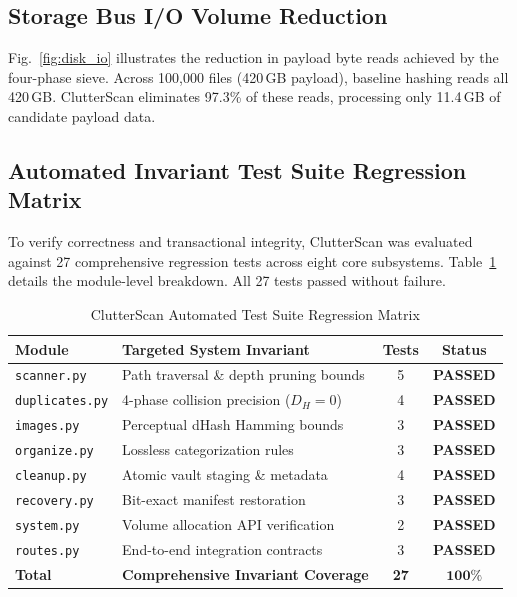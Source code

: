 \documentclass[journal,compsoc,10pt,twocolumn]{IEEEtran}
\begin{document}
\subsection{Storage Bus I/O Volume Reduction}
Fig.~\ref{fig:disk_io} illustrates the reduction in payload byte reads achieved by the four-phase sieve. Across 100,000 files (420\,GB payload), baseline hashing reads all 420\,GB. ClutterScan eliminates 97.3\% of these reads, processing only 11.4\,GB of candidate payload data.

\subsection{Automated Invariant Test Suite Regression Matrix}
To verify correctness and transactional integrity, ClutterScan was evaluated against 27 comprehensive regression tests across eight core subsystems. Table~\ref{tab:tests} details the module-level breakdown. All 27 tests passed without failure.

\begin{table}[h]
\caption{ClutterScan Automated Test Suite Regression Matrix}
\label{tab:tests}
\centering
\small
\begin{tabularx}{\columnwidth}{llcc}
\toprule
\textbf{Module} & \textbf{Targeted System Invariant} & \textbf{Tests} & \textbf{Status} \\
\midrule
\texttt{scanner.py}      & Path traversal \& depth pruning bounds & 5 & \textbf{PASSED} \\
\texttt{duplicates.py}   & 4-phase collision precision ($D_H = 0$) & 4 & \textbf{PASSED} \\
\texttt{images.py}       & Perceptual dHash Hamming bounds       & 3 & \textbf{PASSED} \\
\texttt{organize.py}     & Lossless categorization rules         & 3 & \textbf{PASSED} \\
\texttt{cleanup.py}      & Atomic vault staging \& metadata      & 4 & \textbf{PASSED} \\
\texttt{recovery.py}     & Bit-exact manifest restoration        & 3 & \textbf{PASSED} \\
\texttt{system.py}       & Volume allocation API verification    & 2 & \textbf{PASSED} \\
\texttt{routes.py}       & End-to-end integration contracts      & 3 & \textbf{PASSED} \\
\midrule
\textbf{Total}           & \textbf{Comprehensive Invariant Coverage} & \textbf{27} & $\mathbf{100\%}$ \\
\bottomrule
\end{tabularx}
\end{table}
\end{document}
